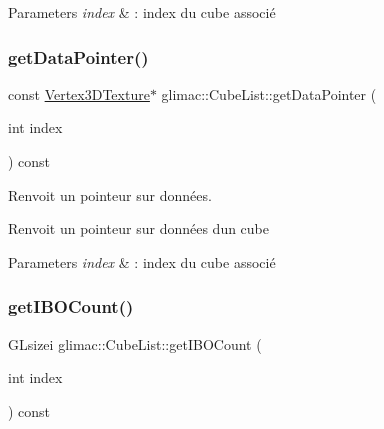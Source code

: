 \begin{DoxyParams}{Parameters}
{\em index} & \+: index du cube associé \\
\hline
\end{DoxyParams}
\mbox{\label{classglimac_1_1CubeList_a990f5d349a4b6fd690f8b61d0ebacd7f}} 
\subsubsection{\texorpdfstring{get\+Data\+Pointer()}{getDataPointer()}}
{\footnotesize\ttfamily const \hyperlink{structglimac_1_1Vertex3DTexture}{Vertex3\+D\+Texture}$\ast$ glimac\+::\+Cube\+List\+::get\+Data\+Pointer (\begin{DoxyParamCaption}\item[{int}]{index }\end{DoxyParamCaption}) const\hspace{0.3cm}{\ttfamily [inline]}}



Renvoit un pointeur sur données. 

Renvoit un pointeur sur données d\textquotesingle{}un cube


\begin{DoxyParams}{Parameters}
{\em index} & \+: index du cube associé \\
\hline
\end{DoxyParams}
\mbox{\label{classglimac_1_1CubeList_a317ef23831d1ec198f69586bcd5fa749}} 
\subsubsection{\texorpdfstring{get\+I\+B\+O\+Count()}{getIBOCount()}}
{\footnotesize\ttfamily G\+Lsizei glimac\+::\+Cube\+List\+::get\+I\+B\+O\+Count (\begin{DoxyParamCaption}\item[{int}]{index }\end{DoxyParamCaption}) const\hspace{0.3cm}{\ttfamily [inline]}}



